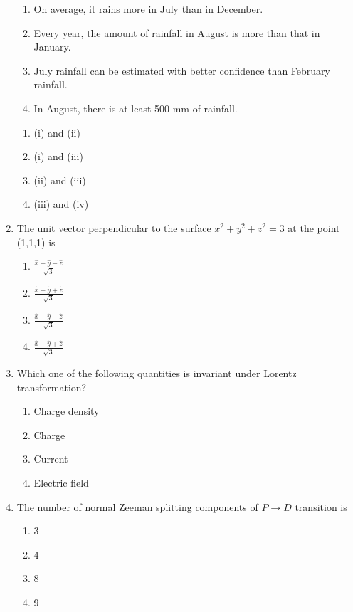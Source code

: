 \documentclass[journal,12pt,onecolumn]{IEEEtran}
\theoremstyle{remark}
\begin{document}
\begin{enumerate}




\begin{enumerate}
    \item On average, it rains more in July than in December.
    \item Every year, the amount of rainfall in August is more than that in January.
    \item July rainfall can be estimated with better confidence than February rainfall.
    \item In August, there is at least 500 mm of rainfall.
\end{enumerate}

\begin{enumerate}
    \item (i) and (ii)
    \item (i) and (iii)
    \item (ii) and (iii)
    \item (iii) and (iv)
\end{enumerate}
 \item The unit vector perpendicular to the surface $x^2 + y^2 + z^2 = 3$ at the point (1,1,1) is
        \begin{enumerate}
            \item $\frac{\hat{x} + \hat{y} - \hat{z}}{\sqrt{3}}$
            \item $\frac{\hat{x} - \hat{y} + \hat{z}}{\sqrt{3}}$
            \item $\frac{\hat{x} - \hat{y} - \hat{z}}{\sqrt{3}}$
            \item $\frac{\hat{x} + \hat{y} + \hat{z}}{\sqrt{3}}$
        \end{enumerate}

    \item Which one of the following quantities is invariant under Lorentz transformation?
        \begin{enumerate}
            \item Charge density
            \item Charge
            \item Current
            \item Electric field
        \end{enumerate}

    \item The number of normal Zeeman splitting components of $P \rightarrow D$ transition is
        \begin{enumerate}
            \item 3
            \item 4
            \item 8
            \item 9
        \end{enumerate}
\end{enumerate}
\end{document}
